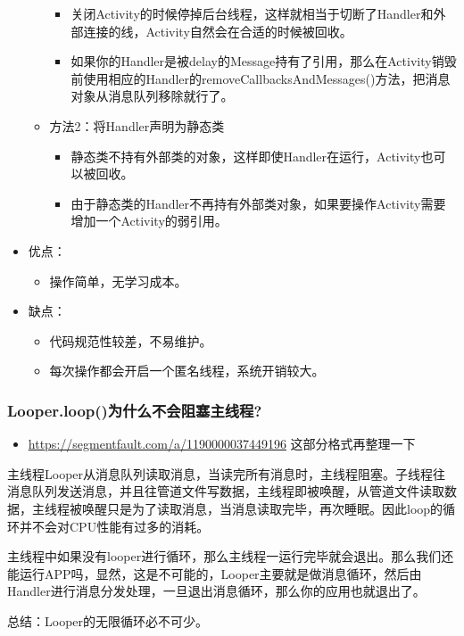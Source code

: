 \documentclass[9pt, b5paper]{article}
\begin{document}
\begin{itemize}
\begin{itemize}
\begin{itemize}
\item 关闭Activity的时候停掉后台线程，这样就相当于切断了Handler和外部连接的线，Activity自然会在合适的时候被回收。
\item 如果你的Handler是被delay的Message持有了引用，那么在Activity销毁前使用相应的Handler的removeCallbacksAndMessages()方法，把消息对象从消息队列移除就行了。
\end{itemize}
\item 方法2：将Handler声明为静态类
\begin{itemize}
\item 静态类不持有外部类的对象，这样即使Handler在运行，Activity也可以被回收。
\item 由于静态类的Handler不再持有外部类对象，如果要操作Activity需要增加一个Activity的弱引用。
\end{itemize}
\end{itemize}
\item 优点：
\begin{itemize}
\item 操作简单，无学习成本。
\end{itemize}
\item 缺点：
\begin{itemize}
\item 代码规范性较差，不易维护。
\item 每次操作都会开启一个匿名线程，系统开销较大。
\end{itemize}
\end{itemize}
\subsubsection{Looper.loop()为什么不会阻塞主线程?}
\label{sec-2-3-1}
\begin{itemize}
\item \url{https://segmentfault.com/a/1190000037449196} 这部分格式再整理一下
\end{itemize}
主线程Looper从消息队列读取消息，当读完所有消息时，主线程阻塞。子线程往消息队列发送消息，并且往管道文件写数据，主线程即被唤醒，从管道文件读取数据，主线程被唤醒只是为了读取消息，当消息读取完毕，再次睡眠。因此loop的循环并不会对CPU性能有过多的消耗。

主线程中如果没有looper进行循环，那么主线程一运行完毕就会退出。那么我们还能运行APP吗，显然，这是不可能的，Looper主要就是做消息循环，然后由Handler进行消息分发处理，一旦退出消息循环，那么你的应用也就退出了。

总结：Looper的无限循环必不可少。
\end{document}
